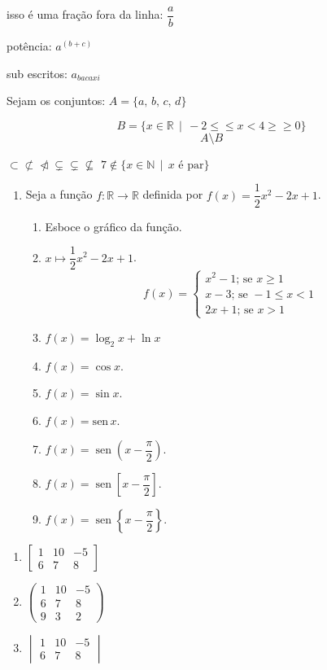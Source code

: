 \documentclass[a4paper,12pt]{article}
\DeclareMathOperator{\sen}{sen}
\begin{document}
   isso é uma fração fora da linha: $\dfrac{a}{b}$
   
   potência: $a^{(b+c)}$
   
   sub escritos: $a_{bacaxi}$
   
   Sejam os conjuntos: $ A = \{ a,\,b,\,c,\,d\}$
   
   $$ B= \{ x\in \mathbb{R} \,\mid \,-2 \leq \leqslant x < 4\geqslant \geq 0 \}  $$ 
   $$A \setminus B$$
   
   $\subset \not\subset \ntriangleleft \subsetneq \varsubsetneq\nsubseteq$ \newline $7 \not\in \{ x \in \mathbb{N} \, \mid \,x \textrm{ é par}\}$  
   \begin{enumerate}
      \item Seja a função $f:\mathbb{R} \to \mathbb{R}$ definida por $f(x)= \dfrac{1}{2}x^2-2x + 1$.
      \begin{enumerate}
         \item Esboce o gráfico da função.
         \item $x \mapsto \dfrac{1}{2}x^2-2x + 1$.
         $$f(x)=   
   \begin{cases}
      x^2 - 1; \,\textrm{se } x \geq 1\\
      x-3;\,\textrm{se }-1 \leq x < 1\\
      2x + 1; \,\textrm{se } x>1
   \end{cases}$$
         \item $f(x)= \log_2x + \ln x $
         \item $f(x) = \cos x$.
         \item $f(x) = \sin x$.
         \item $f(x) = \textrm{sen}\, x$.
         \item $f(x) = \sen \left( x- \dfrac{\pi}{2}\right)$.
         \item $f(x) = \sen \left[ x- \dfrac{\pi}{2}\right]$.
         
          \item $f(x) = \sen \left\{ x- \dfrac{\pi}{2}\right\}$.
      \end{enumerate}
   \end{enumerate}     
   \begin{enumerate}
    \item$\begin{bmatrix}
      1 & 10 & -5 \\
      6&7&8
   \end{bmatrix}$  
   \item $ \begin{pmatrix}
      1 & 10 & -5 \\
      6&7&8 \\ 9&3&2
      \end{pmatrix}$
      \item $\begin{vmatrix}
      1 & 10 & -5 \\
      6&7&8
      \end{vmatrix}$ 
   \end{enumerate}
\end{document}
